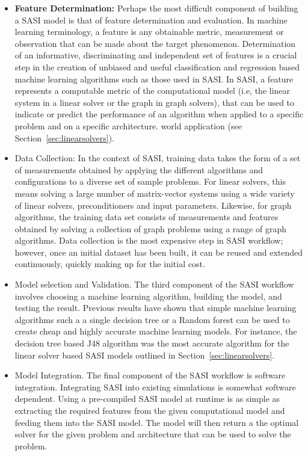 \begin{itemize}
 \item {\bf Feature Determination:} Perhaps the most difficult component of building a SASI model is that of feature determination and evaluation. In machine learning terminology, a feature is any obtainable metric, measurement or observation that can be made about the target phenomenon. Determination of an informative, discriminating and independent set of features is a crucial step in the creation of unbiased and useful classification and regression based machine learning algorithms such as those used in SASI. In SASI, a feature represents a computable metric of the computational model (i.e, the linear system in a linear solver or the graph in graph solvers), that can be used to indicate or predict the performance of an algorithm when applied to a specific problem and on a specific architecture. 
 world application (see Section~\ref{sec:linearsolvers}). 
 
 \item Data Collection: In the context of SASI, training data takes the form of a set of measurements obtained by applying the different algorithms and configurations to a diverse set of sample problems. For linear solvers, this means solving a large number of matrix-vector systems using a wide variety of linear solvers, preconditioners and input parameters. Likewise, for graph algorithms, the training data set consists of measurements and features obtained by solving a collection of graph problems using a range of graph algorithms. Data collection is the most expensive step in SASI workflow; however, once an initial dataset has been built, it can be reused and extended continuously, quickly making up for the initial cost. 
 
 \item Model selection and Validation. The third component of the SASI workflow involves choosing a machine learning algorithm, building the model, and testing the result. Previous results have shown that simple machine learning algorithms such a a single decision tree or a Random forest can be used to create cheap and highly accurate machine learning models. For instance, the decision tree based J48 algorithm was the most accurate algorithm for the linear solver based SASI models outlined in Section~\ref{sec:linearsolvers}.  
 
 \item Model Integration. The final component of the SASI workflow is software integration. Integrating SASI into existing simulations is somewhat software dependent. Using a pre-compiled SASI model at runtime is as simple as extracting the required features from the given computational model and feeding them into the SASI model. The model will then return a the optimal solver for the given problem and architecture that can be used to solve the problem.  

\end{itemize}

